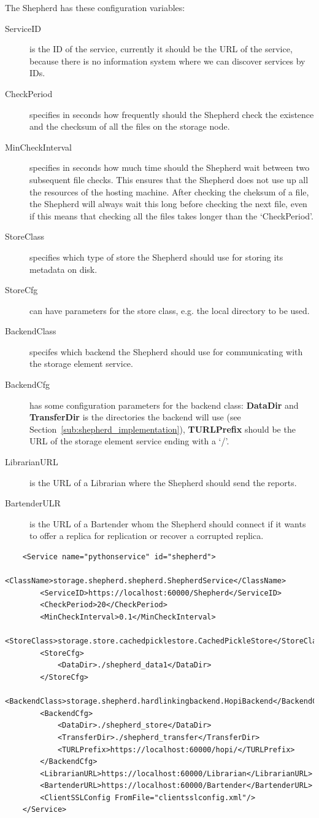 \documentclass{book}
\begin{document}
The Shepherd has these configuration variables:

\begin{description}
    \item[ServiceID] is the ID of the service, currently it should be the URL of the service, because there is no information system where we can discover services by IDs.
    \item[CheckPeriod] specifies in seconds how frequently should the Shepherd check the existence and the checksum of all the files on the storage node.
    \item[MinCheckInterval] specifies in seconds how much time should the Shepherd wait between two subsequent file checks. This ensures that the Shepherd does not use up all the resources of the hosting machine. After checking the cheksum of a file, the Shepherd will always wait this long before checking the next file, even if this means that checking all the files takes longer than the `CheckPeriod'.
    \item[StoreClass] specifies which type of store the Shepherd should use for storing its metadata on disk.
    \item[StoreCfg] can have parameters for the store class, e.g. the local directory to be used.
    \item[BackendClass] specifes which backend the Shepherd should use for communicating with the storage element service.
    \item[BackendCfg] has some configuration parameters for the backend class: \textbf{DataDir} and \textbf{TransferDir} is the directories the backend will use (see Section~\ref{sub:shepherd_implementation}), \textbf{TURLPrefix} should be the URL of the storage element service ending with a `/'.
    \item[LibrarianURL] is the URL of a Librarian where the Shepherd should send the reports.
    \item[BartenderULR] is the URL of a Bartender whom the Shepherd should connect if it wants to offer a replica for replication or recover a corrupted replica.
\end{description}

\begin{verbatim}
    <Service name="pythonservice" id="shepherd">
        <ClassName>storage.shepherd.shepherd.ShepherdService</ClassName>
        <ServiceID>https://localhost:60000/Shepherd</ServiceID>
        <CheckPeriod>20</CheckPeriod>
        <MinCheckInterval>0.1</MinCheckInterval>
        <StoreClass>storage.store.cachedpicklestore.CachedPickleStore</StoreClass>
        <StoreCfg>
            <DataDir>./shepherd_data1</DataDir>
        </StoreCfg>
        <BackendClass>storage.shepherd.hardlinkingbackend.HopiBackend</BackendClass>
        <BackendCfg>
            <DataDir>./shepherd_store</DataDir>
            <TransferDir>./shepherd_transfer</TransferDir>
            <TURLPrefix>https://localhost:60000/hopi/</TURLPrefix>
        </BackendCfg>
        <LibrarianURL>https://localhost:60000/Librarian</LibrarianURL>
        <BartenderURL>https://localhost:60000/Bartender</BartenderURL>
        <ClientSSLConfig FromFile="clientsslconfig.xml"/>
    </Service>    
\end{verbatim}
\end{document}
